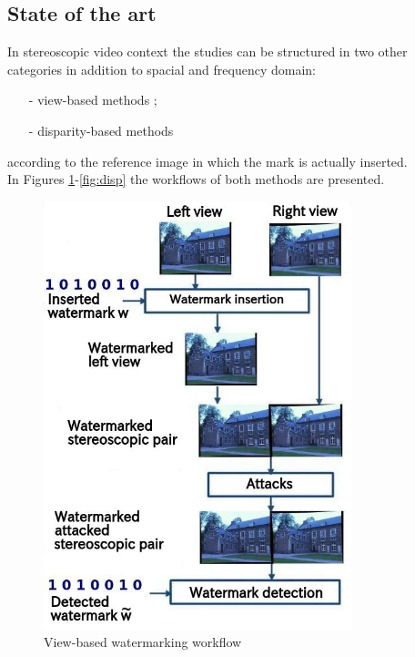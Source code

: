 \subsection{State of the art}
In stereoscopic video context the studies can be structured in two other categories in addition to spacial and frequency domain:
\begin{itemize}
\item[-] view-based methods \cite{16,17,18,19,20,21};
\item[-] disparity-based methods \cite{22}
\end{itemize}
according to the reference image in which the mark is actually inserted.\\
In Figures \ref{fig:view}-\ref{fig:disp} the workflows of both methods are presented.
\begin{figure}[h!]
\centering
\includegraphics[width=0.8\textwidth]{./img/views_domain.jpeg}
\caption{\small{View-based watermarking workflow}}
\label{fig:view}
\end{figure}

